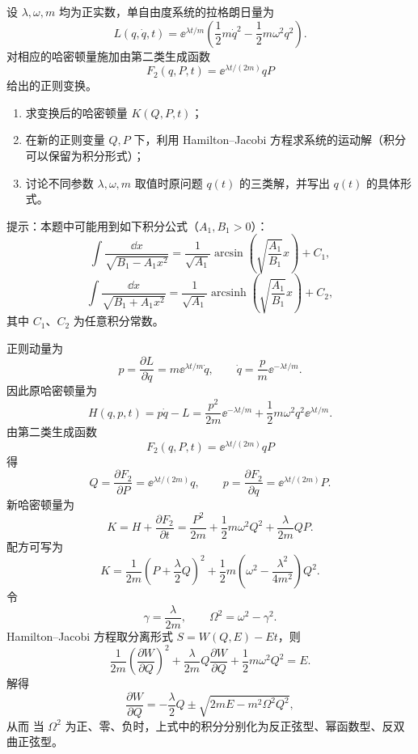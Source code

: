 \begin{question}
设 $\lambda,\omega,m$ 均为正实数，单自由度系统的拉格朗日量为
\[
  L(q,\dot q,t)=\ee^{\lambda t/m}\left(\frac12m\dot q^2-\frac12m\omega^2q^2\right).
\]
对相应的哈密顿量施加由第二类生成函数
\[
  F_2(q,P,t)=\ee^{\lambda t/(2m)}qP
\]
给出的正则变换。
\begin{enumerate}
  \item 求变换后的哈密顿量 $K(Q,P,t)$；
  \item 在新的正则变量 $Q,P$ 下，利用 Hamilton--Jacobi 方程求系统的运动解（积分可以保留为积分形式）；
  \item 讨论不同参数 $\lambda,\omega,m$ 取值时原问题 $q(t)$ 的三类解，并写出 $q(t)$ 的具体形式。
\end{enumerate}

提示：本题中可能用到如下积分公式（$A_1,B_1>0$）：
\[
  \int\frac{\dd x}{\sqrt{B_1-A_1x^2}}
  =\frac{1}{\sqrt{A_1}}\arcsin\left(\sqrt{\frac{A_1}{B_1}}x\right)+C_1,
\]
\[
  \int\frac{\dd x}{\sqrt{B_1+A_1x^2}}
  =\frac{1}{\sqrt{A_1}}\operatorname{arcsinh}\left(\sqrt{\frac{A_1}{B_1}}x\right)+C_2,
\]
其中 $C_1$、$C_2$ 为任意积分常数。

\begin{solution}
正则动量为
\[
  p=\frac{\partial L}{\partial\dot q}=m\ee^{\lambda t/m}\dot q,
  \qquad
  \dot q=\frac{p}{m}\ee^{-\lambda t/m}.
\]
因此原哈密顿量为
\[
  H(q,p,t)=p\dot q-L
  =\frac{p^2}{2m}\ee^{-\lambda t/m}
  +\frac12m\omega^2q^2\ee^{\lambda t/m}.
\]
由第二类生成函数
\[
  F_2(q,P,t)=\ee^{\lambda t/(2m)}qP
\]
得
\[
  Q=\frac{\partial F_2}{\partial P}=\ee^{\lambda t/(2m)}q,
  \qquad
  p=\frac{\partial F_2}{\partial q}=\ee^{\lambda t/(2m)}P.
\]
新哈密顿量为
\[
  K=H+\frac{\partial F_2}{\partial t}
  =\frac{P^2}{2m}+\frac12m\omega^2Q^2+\frac{\lambda}{2m}QP.
\]
配方可写为
\[
  K=\frac{1}{2m}\left(P+\frac\lambda2Q\right)^2
  +\frac12m\left(\omega^2-\frac{\lambda^2}{4m^2}\right)Q^2.
\]
令
\[
  \gamma=\frac{\lambda}{2m},
  \qquad
  \Omega^2=\omega^2-\gamma^2.
\]
Hamilton--Jacobi 方程取分离形式 $S=W(Q,E)-Et$，则
\[
  \frac{1}{2m}\left(\frac{\partial W}{\partial Q}\right)^2
  +\frac{\lambda}{2m}Q\frac{\partial W}{\partial Q}
  +\frac12m\omega^2Q^2=E.
\]
解得
\[
  \frac{\partial W}{\partial Q}
  =-\frac\lambda2Q\pm\sqrt{2mE-m^2\Omega^2Q^2},
\]
从而
当 $\Omega^2$ 为正、零、负时，上式中的积分分别化为反正弦型、幂函数型、反双曲正弦型。


\end{solution}
\end{question}

